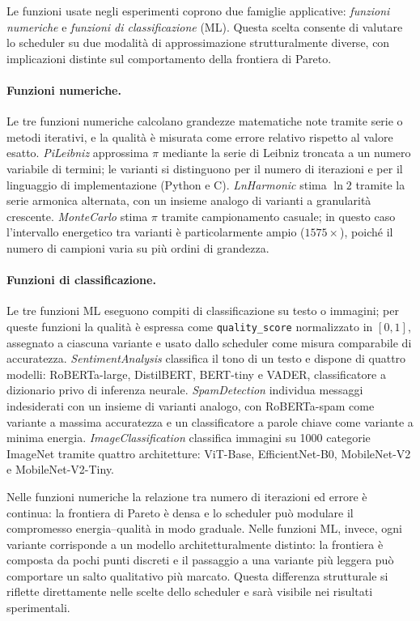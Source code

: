 Le funzioni usate negli esperimenti coprono due famiglie applicative:
\emph{funzioni numeriche} e \emph{funzioni di classificazione} (ML).
Questa scelta consente di valutare lo scheduler su due modalità di
approssimazione strutturalmente diverse, con implicazioni distinte sul
comportamento della frontiera di Pareto.

\paragraph{Funzioni numeriche.}
Le tre funzioni numeriche calcolano grandezze matematiche note tramite
serie o metodi iterativi, e la qualità è misurata come errore relativo
rispetto al valore esatto. \emph{PiLeibniz} approssima $\pi$ mediante la
serie di Leibniz troncata a un numero variabile di termini; le varianti si
distinguono per il numero di iterazioni e per il linguaggio di
implementazione (Python e C). \emph{LnHarmonic} stima $\ln 2$ tramite la
serie armonica alternata, con un insieme analogo di varianti a granularità
crescente. \emph{MonteCarlo} stima $\pi$ tramite campionamento casuale;
in questo caso l'intervallo energetico tra varianti è particolarmente
ampio ($1575\times$), poiché il numero di campioni varia su più ordini
di grandezza.

\paragraph{Funzioni di classificazione.}
Le tre funzioni ML eseguono compiti di classificazione su testo o immagini;
per queste funzioni la qualità è espressa come \texttt{quality\_score}
normalizzato in $[0,1]$, assegnato a ciascuna variante e usato dallo
scheduler come misura comparabile di accuratezza.
\emph{SentimentAnalysis} classifica il tono di un testo e dispone di
quattro modelli: RoBERTa-large, DistilBERT, BERT-tiny e VADER,
classificatore a dizionario privo di inferenza neurale.
\emph{SpamDetection} individua messaggi indesiderati con un insieme di
varianti analogo, con RoBERTa-spam come variante a massima accuratezza e
un classificatore a parole chiave come variante a minima energia.
\emph{ImageClassification} classifica
immagini su 1000 categorie ImageNet tramite quattro architetture: ViT-Base,
EfficientNet-B0, MobileNet-V2 e MobileNet-V2-Tiny.

Nelle funzioni numeriche la relazione tra numero di iterazioni ed errore
è continua: la frontiera di Pareto è densa e lo scheduler può modulare
il compromesso energia--qualità in modo graduale. Nelle funzioni ML,
invece, ogni variante corrisponde a un modello architetturalmente distinto:
la frontiera è composta da pochi punti discreti e il passaggio a una
variante più leggera può comportare un salto qualitativo più marcato.
Questa differenza strutturale si riflette direttamente nelle scelte dello
scheduler e sarà visibile nei risultati sperimentali.


